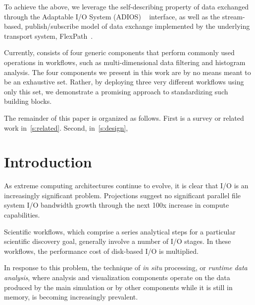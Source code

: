 To achieve the above, we leverage the self-describing
property of data exchanged through the Adaptable I/O System (ADIOS)
~\cite{lofstead:2009:adaptable} interface,
as well as the stream-based, publish/subscribe
model of data exchange implemented by the underlying transport
system, FlexPath~\cite{dayal:2014:flexpath}.

Currently, \sys consists of four generic components that
perform commonly used operations in workflows, such
as multi-dimensional data filtering and histogram
analysis.
The four components we present in this work
are by no means meant to be an exhaustive set.
Rather, by deploying three very different workflows
using only this set, we demonstrate a promising
approach to standardizing such building blocks.

The remainder of this paper is organized as follows.
First is a survey or related
work in~\autoref{s:related}.
Second, in~\autoref{s:design},


\section{Introduction}
\label{s:intro}

As extreme computing architectures continue to evolve, it is 
clear that I/O is an increasingly significant problem.  Projections suggest no
significant parallel file system I/O bandwidth growth through the next 100x
increase in compute capabilities.

Scientific workflows, which comprise a series analytical steps for a
particular scientific discovery goal, generally involve a number of
I/O stages. In these workflows, the performance cost of disk-based I/O
is multiplied.

In response to this problem, the technique of \textit{in situ}
processing, or \textit{runtime data analysis},
where analysis and visualization components
operate on the data produced by the main simulation
or by other components while it is still in memory,
is becoming increasingly prevalent.


